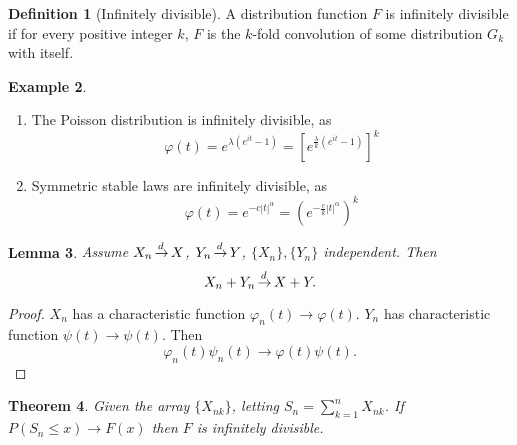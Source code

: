 \documentclass[10pt, oneside, reqno]{amsart}
\theoremstyle{plain}%
\newtheorem{thm}{Theorem}[section]
\newtheorem{lem}[thm]{Lemma}
\theoremstyle{definition}
\newtheorem{defn}[thm]{Definition}
\newtheorem{exmp}[thm]{Example}
\theoremstyle{remark}
\renewcommand{\phi}{\varphi}
\def\cid{\,{\buildrel \!d \over \rightarrow}\,}
\begin{document}
\begin{defn}[Infinitely divisible]
	A distribution function $F$ is infinitely divisible if for every positive integer $k$, $F$ is the $k$-fold convolution of some distribution $G_k$ with itself.  
\end{defn}

\begin{exmp}
	\begin{enumerate}[(1)]
		\item The Poisson distribution is infinitely divisible, as \[
			\phi(t) = e^{\lambda(e^{it} - 1)} = \left[ e^{\frac{\lambda}{k}(e^{it} - 1)} \right]^k
		\]
		\item Symmetric stable laws are infinitely divisible, as \[
			\phi(t) = e^{-c|t|^\alpha} = \left( e^{-\frac{c}{k}|t|^\alpha} \right)^k
		\]
	\end{enumerate}
\end{exmp}

\begin{lem}
	Assume $X_n \cid X$, $Y_n \cid Y$, $\{ X_n \}, \{ Y_n \}$ independent.  Then \[
		X_n + Y_n \cid X + Y.
		\]  
\end{lem}
\begin{proof}
	$X_n$ has a characteristic function $\phi_n(t) \rightarrow \phi(t)$.  $Y_n$ has characteristic function $\psi(t) \rightarrow \psi(t)$. Then \[
		\phi_n(t) \psi_n(t) \rightarrow \phi(t) \psi(t).
	\]   
\end{proof}

\begin{thm}
	Given the array $\{ X_{nk} \}$, letting $S_n = \sum_{k=1}^n X_{nk}$.  If $P(S_n \leq x) \rightarrow F(x)$ then $F$ is infinitely divisible.  
\end{thm}
\end{document}
